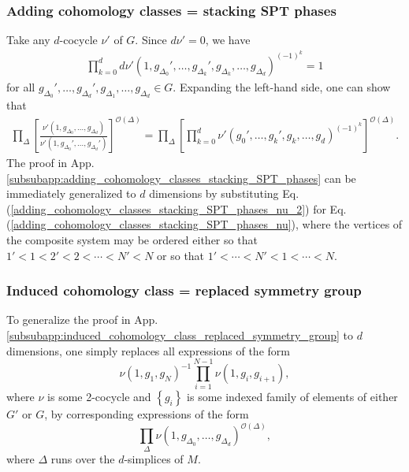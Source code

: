 \documentclass[sort&compress]{elsarticle}
\theoremstyle{theoremstyle}
\theoremstyle{framedtheoremstyle}
\theoremstyle{definitionstyle}
\theoremstyle{definitionstyle}
\theoremstyle{definitionstyle}
\theoremstyle{definitionstyle}
\theoremstyle{nameddefinitionstyle}
\theoremstyle{framednameddefinitionstyle}
\theoremstyle{proofstyle}
\theoremstyle{definitionstyle}
\newcommand{\paren}[1]{\left( #1 \right)}
\newcommand{\brackets}[1]{\left[ #1 \right]}
\newcommand{\braces}[1]{\left\{ #1 \right\}}
\begin{document}
\begin{appendices}
\subsubsection{Adding cohomology classes = stacking SPT phases\label{subsubapp:adding_cohomology_classes_stacking_SPT_phases_2}}

Take any $d$-cocycle $\nu'$ of $G$. Since $d\nu'=0$, we have
\begin{eqnarray}
\prod_{k=0}^d d\nu' \paren{ 1, g_{\Delta_0}', \ldots, g_{\Delta_k}', g_{\Delta_k}, \ldots, g_{\Delta_d} }^{(-1)^k} = 1
\end{eqnarray}
for all $g_{\Delta_0}', \ldots, g_{\Delta_d}', g_{\Delta_1}, \ldots, g_{\Delta_d}\in G$. Expanding the left-hand side, one can show that
\begin{eqnarray}
\prod_\Delta \brackets{ \frac{ \nu' \paren{1, g_{\Delta_0}, \ldots, g_{\Delta_d} } }{ \nu' \paren{1, g_{\Delta_0}', \ldots, g_{\Delta_d}' } } }^{ \mathcal O(\Delta) }
= \prod_\Delta \brackets{ \prod_{k=0}^d \nu'\paren{g_0', \ldots, g_k', g_k, \ldots, g_d }^{(-1)^k} }^{\mathcal O(\Delta)}.\label{adding_cohomology_classes_stacking_SPT_phases_nu_2}
\end{eqnarray}
The proof in App.\,\ref{subsubapp:adding_cohomology_classes_stacking_SPT_phases} can be immediately generalized to $d$ dimensions by substituting Eq.\,(\ref{adding_cohomology_classes_stacking_SPT_phases_nu_2}) for Eq.\,(\ref{adding_cohomology_classes_stacking_SPT_phases_nu}), where the vertices of the composite system may be ordered either so that $1'<1<2'<2<\cdots<N'<N$ or so that $1'<\cdots<N'<1<\cdots<N$.





\subsubsection{Induced cohomology class = replaced symmetry group\label{subsubapp:induced_cohomology_class_replaced_symmetry_group_2}}

To generalize the proof in App.\,\ref{subsubapp:induced_cohomology_class_replaced_symmetry_group} to $d$ dimensions, one simply replaces all expressions of the form
\begin{equation}
\nu(1, g_1, g_N)^{-1} \prod_{i=1}^{N-1} \nu(1, g_i, g_{i+1}),
\end{equation}
where $\nu$ is some 2-cocycle and $\braces{g_i}$ is some indexed family of elements of either $G'$ or $G$, by corresponding expressions of the form
\begin{equation}
\prod_{\Delta} \nu\paren{1, g_{\Delta_0}, \ldots, g_{\Delta_d}}^{\mathcal O(\Delta)},
\end{equation}
where $\Delta$ runs over the $d$-simplices of $M$.












\end{appendices}
\end{document}
